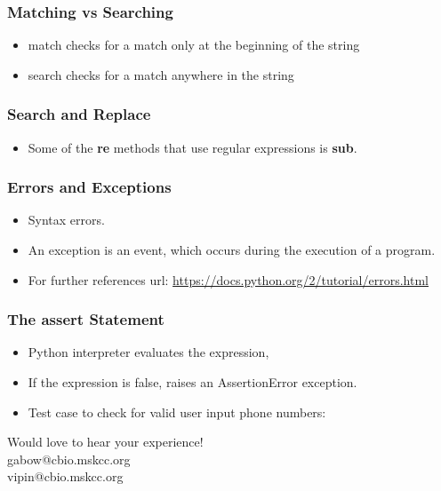 \documentclass[11pt]{beamer}
\makeatletter
\newcommand{\thankyou}
{\begin{center} Would love to hear your experience! \\ gabow@cbio.mskcc.org \\ vipin@cbio.mskcc.org \end{center}}
\makeatother
\begin{document}
\begin{frame}[plain]
    \frametitle{Matching vs Searching}
    \begin{itemize}
        \item[] match checks for a match only at the beginning of the string
        \pause
        \item[] search checks for a match anywhere in the string
        \pause
        \newline
        
    \end{itemize}
\end{frame}
\begin{frame}[plain]
    \frametitle{Search and Replace}
    \begin{itemize}
        \item[] Some of the \textbf{re} methods that use regular expressions is \textbf{sub}.
        \newline
        \pause
        
        \pause
        
    \end{itemize}
\end{frame}
\begin{frame}[plain]
    \frametitle{Errors and Exceptions}
    \begin{itemize}
        \item[] Syntax errors.
        
        \pause
        \item[] An exception is an event, which occurs during the execution of a program.
        
        \pause
        \item[] For further references url: \url{https://docs.python.org/2/tutorial/errors.html} 
    \end{itemize}
\end{frame}
\begin{frame}[plain]
    \frametitle{The assert Statement}
    \begin{itemize}
        \item[] Python interpreter evaluates the expression,
        \item[] If the expression is false, raises an AssertionError exception.
        \newline
        
        \pause
        \item[] Test case to check for valid user input phone numbers: 
        \newline
        
    \end{itemize}
\end{frame}
%
\begin{frame}[plain]
    \thankyou
\end{frame}
\end{document}
